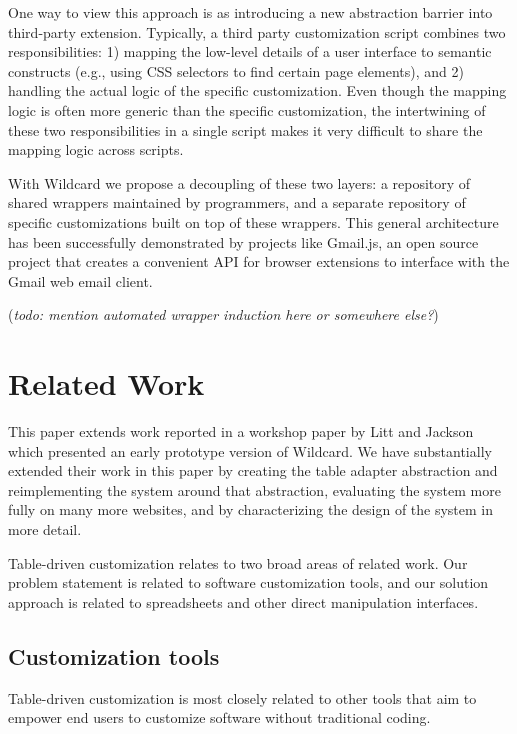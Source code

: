 \documentclass[sigplan,screen,10pt,anonymous,review]{acmart}
\begin{document}
One way to view this approach is as introducing a new abstraction
barrier into third-party extension. Typically, a third party
customization script combines two responsibilities: 1) mapping the
low-level details of a user interface to semantic constructs (e.g.,
using CSS selectors to find certain page elements), and 2) handling the
actual logic of the specific customization. Even though the mapping
logic is often more generic than the specific customization, the
intertwining of these two responsibilities in a single script makes it
very difficult to share the mapping logic across scripts.

With Wildcard we propose a decoupling of these two layers: a repository
of shared wrappers maintained by programmers, and a separate repository
of specific customizations built on top of these wrappers. This general
architecture has been successfully demonstrated by projects like
Gmail.js, an open source project that creates a convenient API for
browser extensions to interface with the Gmail web email client.

(\emph{todo: mention automated wrapper induction here or somewhere
else?})

\hypertarget{sec:related-work}{%
\section{Related Work}\label{sec:related-work}}

This paper extends work reported in a workshop paper by Litt and Jackson
\citep{litt2020} which presented an early prototype version of Wildcard.
We have substantially extended their work in this paper by creating the
table adapter abstraction and reimplementing the system around that
abstraction, evaluating the system more fully on many more websites, and
by characterizing the design of the system in more detail.

Table-driven customization relates to two broad areas of related work.
Our problem statement is related to software customization tools, and
our solution approach is related to spreadsheets and other direct
manipulation interfaces.

\hypertarget{customization-tools}{%
\subsection{Customization tools}\label{customization-tools}}

Table-driven customization is most closely related to other tools that
aim to empower end users to customize software without traditional
coding.
\end{document}
